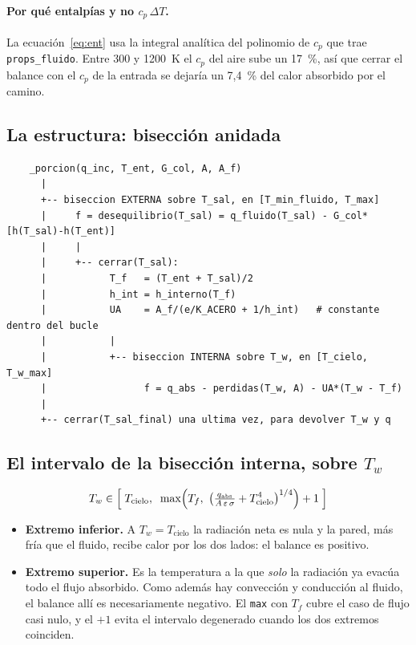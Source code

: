 \documentclass[11pt,a4paper]{article}
\begin{document}
\paragraph{Por qué entalpías y no $c_p\,\Delta T$.} La ecuación~\eqref{eq:ent}
usa la integral analítica del polinomio de $c_p$ que trae
\texttt{props\_fluido}. Entre 300 y 1200~K el $c_p$ del aire sube un 17~\%, así
que cerrar el balance con el $c_p$ de la entrada se dejaría un 7,4~\% del calor
absorbido por el camino.

\subsection{La estructura: bisección anidada}

\begin{verbatim}
    _porcion(q_inc, T_ent, G_col, A, A_f)
      |
      +-- biseccion EXTERNA sobre T_sal, en [T_min_fluido, T_max]
      |     f = desequilibrio(T_sal) = q_fluido(T_sal) - G_col*[h(T_sal)-h(T_ent)]
      |     |
      |     +-- cerrar(T_sal):
      |           T_f   = (T_ent + T_sal)/2
      |           h_int = h_interno(T_f)
      |           UA    = A_f/(e/K_ACERO + 1/h_int)   # constante dentro del bucle
      |           |
      |           +-- biseccion INTERNA sobre T_w, en [T_cielo, T_w_max]
      |                 f = q_abs - perdidas(T_w, A) - UA*(T_w - T_f)
      |
      +-- cerrar(T_sal_final) una ultima vez, para devolver T_w y q
\end{verbatim}

\subsection{El intervalo de la bisección interna, sobre $T_w$}

\[
  T_w \in \Bigl[\;T_{\mathrm{cielo}},\;\;
  \max\Bigl(T_f,\ \bigl(\tfrac{q_{\mathrm{abs}}}{A\,\varepsilon\,\sigma} + T_{\mathrm{cielo}}^4\bigr)^{1/4}\Bigr) + 1\;\Bigr]
\]

\begin{itemize}
  \item \textbf{Extremo inferior.} A $T_w = T_{\mathrm{cielo}}$ la radiación neta
        es nula y la pared, más fría que el fluido, recibe calor por los dos
        lados: el balance es positivo.
  \item \textbf{Extremo superior.} Es la temperatura a la que \emph{solo} la
        radiación ya evacúa todo el flujo absorbido. Como además hay convección
        y conducción al fluido, el balance allí es necesariamente negativo. El
        \texttt{max} con $T_f$ cubre el caso de flujo casi nulo, y el $+1$
        evita el intervalo degenerado cuando los dos extremos coinciden.
\end{itemize}
\end{document}
